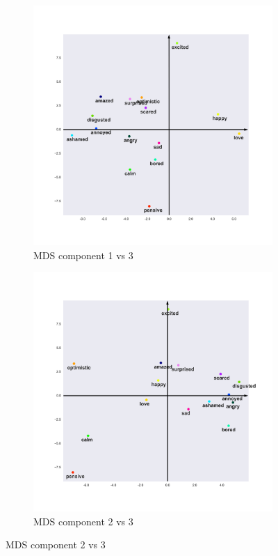 \documentclass{article} %
\begin{document}
\begin{figure}[H]
    \begin{subfigure}[t]{.5\textwidth}
        \vskip 0pt %
        \centering
        \includegraphics[width=\linewidth]{Images/mds-center-1vs3.jpg}
        \caption{MDS component 1 vs 3}
   \end{subfigure}
   \begin{subfigure}[t]{.5\textwidth}
       \vskip 0pt
       \centering
       \includegraphics[width=\linewidth]{Images/mds-center-2vs3.jpg}
       \caption{MDS component 2 vs 3}
    \end{subfigure}
\end{figure}
\end{document}
